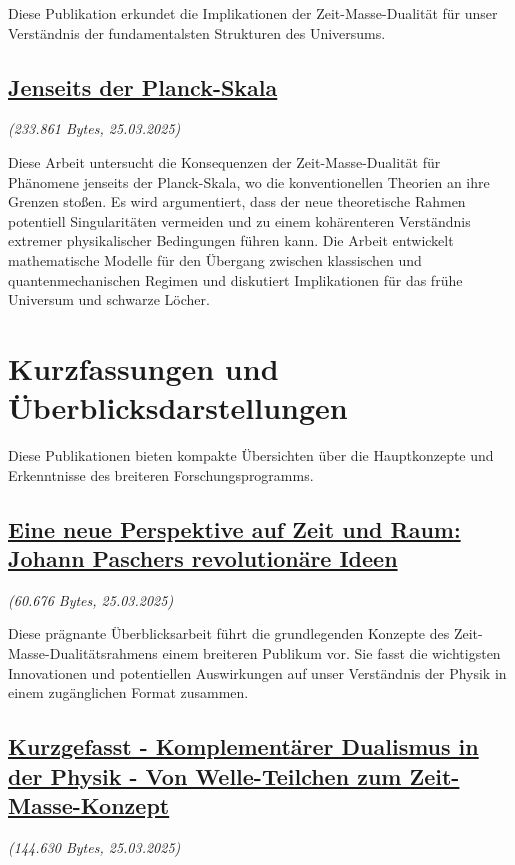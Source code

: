 \documentclass[a4paper,12pt]{article}
\newcommand{\repobase}{https://github.com/jpascher/T0-Time-Mass-Duality/tree/main/2/}
\begin{document}
	Diese Publikation erkundet die Implikationen der Zeit-Masse-Dualität für unser Verständnis der fundamentalsten Strukturen des Universums.
	
	\subsection{\href{\repobase/pdf/Deutsch/Jenseits der Planck-Skala.pdf}{Jenseits der Planck-Skala}}
	\textit{(233.861 Bytes, 25.03.2025)}
	
	Diese Arbeit untersucht die Konsequenzen der Zeit-Masse-Dualität für Phänomene jenseits der Planck-Skala, wo die konventionellen Theorien an ihre Grenzen stoßen. Es wird argumentiert, dass der neue theoretische Rahmen potentiell Singularitäten vermeiden und zu einem kohärenteren Verständnis extremer physikalischer Bedingungen führen kann. Die Arbeit entwickelt mathematische Modelle für den Übergang zwischen klassischen und quantenmechanischen Regimen und diskutiert Implikationen für das frühe Universum und schwarze Löcher.
	
	\section{Kurzfassungen und Überblicksdarstellungen}
	
	Diese Publikationen bieten kompakte Übersichten über die Hauptkonzepte und Erkenntnisse des breiteren Forschungsprogramms.
	
	\subsection{\href{\repobase/pdf/Deutsch kurzgefasst/Eine neue Perspektive auf Zeit und Raum Johann Paschers revolutionäre Ideen.pdf}{Eine neue Perspektive auf Zeit und Raum: Johann Paschers revolutionäre Ideen}}
	\textit{(60.676 Bytes, 25.03.2025)}
	
	Diese prägnante Überblicksarbeit führt die grundlegenden Konzepte des Zeit-Masse-Dualitätsrahmens einem breiteren Publikum vor. Sie fasst die wichtigsten Innovationen und potentiellen Auswirkungen auf unser Verständnis der Physik in einem zugänglichen Format zusammen.
	
	\subsection{\href{\repobase/pdf/Deutsch kurzgefasst/Kurzgefasst - Komplementärer Dualismus in der Physik - Von Welle-Teilchen zum Zeit-Masse-Konzept.pdf}{Kurzgefasst - Komplementärer Dualismus in der Physik - Von Welle-Teilchen zum Zeit-Masse-Konzept}}
	\textit{(144.630 Bytes, 25.03.2025)}
	
\end{document}
